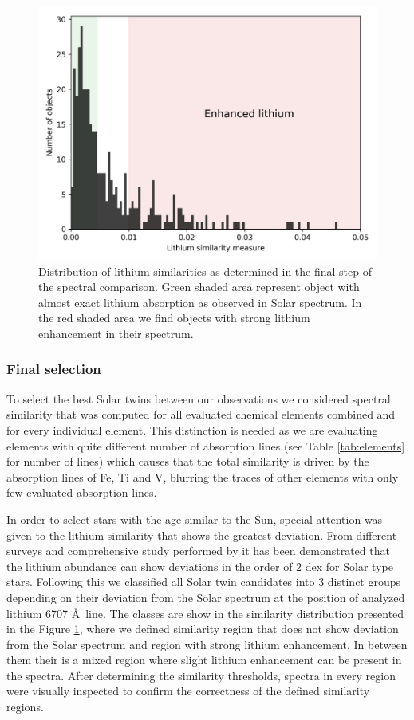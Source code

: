 \begin{figure}
	\centering
	\includegraphics[width=\columnwidth]{lithium_sim_hist.png}
	\caption{Distribution of lithium similarities as determined in the final step of the spectral comparison. Green shaded area represent object with almost exact lithium absorption as observed in Solar spectrum. In the red shaded area we find objects with strong lithium enhancement in their spectrum.}
	\label{fig:lithium_sim_hist}
\end{figure}

\subsubsection{Final selection}
To select the best Solar twins between our observations we considered spectral similarity that was computed for all evaluated chemical elements combined and for every individual element. This distinction is needed as we are evaluating elements with quite different number of absorption lines (see Table \ref{tab:elements} for number of lines) which causes that the total similarity is driven by the absorption lines of Fe, Ti and V, blurring the traces of other elements with only few evaluated absorption lines.

In order to select stars with the age similar to the Sun, special attention was given to the lithium similarity that shows the greatest deviation. From different surveys and comprehensive study performed by \cite{2007A&A...468..663T} it has been demonstrated that the lithium abundance can show deviations in the order of $2$ dex for Solar type stars. Following this we classified all Solar twin candidates into 3 distinct groups depending on their deviation from the Solar spectrum at the position of analyzed lithium 6707 \AA\ line. The classes are show in the similarity distribution presented in the Figure \ref{fig:lithium_sim_hist}, where we defined similarity region that does not show deviation from the Solar spectrum and region with strong lithium enhancement. In between them their is a mixed region where slight lithium enhancement can be present in the spectra. After determining the similarity thresholds, spectra in every region were visually inspected to confirm the correctness of the defined similarity regions.

